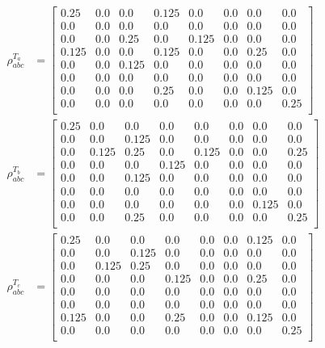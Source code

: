 \documentclass{scrartcl}
\begin{document}
    \begin{align*}
        \rho^{T_a}_{abc} &=
        \left[
        \begin{array}{cccccccc}
        0.25 & 0.0 & 0.0 & 0.125 & 0.0 & 0.0 & 0.0 & 0.0 \\
        0.0 & 0.0 & 0.0 & 0.0 & 0.0 & 0.0 & 0.0 & 0.0 \\
        0.0 & 0.0 & 0.25 & 0.0 & 0.125 & 0.0 & 0.0 & 0.0 \\
        0.125 & 0.0 & 0.0 & 0.125 & 0.0 & 0.0 & 0.25 & 0.0 \\
        0.0 & 0.0 & 0.125 & 0.0 & 0.0 & 0.0 & 0.0 & 0.0 \\
        0.0 & 0.0 & 0.0 & 0.0 & 0.0 & 0.0 & 0.0 & 0.0 \\
        0.0 & 0.0 & 0.0 & 0.25 & 0.0 & 0.0 & 0.125 & 0.0 \\
        0.0 & 0.0 & 0.0 & 0.0 & 0.0 & 0.0 & 0.0 & 0.25 \\
        \end{array}
        \right]   \\
        \rho^{T_b}_{abc} &=
        \left[
        \begin{array}{cccccccc}
        0.25 & 0.0 & 0.0 & 0.0 & 0.0 & 0.0 & 0.0 & 0.0 \\
        0.0 & 0.0 & 0.125 & 0.0 & 0.0 & 0.0 & 0.0 & 0.0 \\
        0.0 & 0.125 & 0.25 & 0.0 & 0.125 & 0.0 & 0.0 & 0.25 \\
        0.0 & 0.0 & 0.0 & 0.125 & 0.0 & 0.0 & 0.0 & 0.0 \\
        0.0 & 0.0 & 0.125 & 0.0 & 0.0 & 0.0 & 0.0 & 0.0 \\
        0.0 & 0.0 & 0.0 & 0.0 & 0.0 & 0.0 & 0.0 & 0.0 \\
        0.0 & 0.0 & 0.0 & 0.0 & 0.0 & 0.0 & 0.125 & 0.0 \\
        0.0 & 0.0 & 0.25 & 0.0 & 0.0 & 0.0 & 0.0 & 0.25 \\
        \end{array}
        \right]\\
        \rho^{T_c}_{abc} &=
        \left[
        \begin{array}{cccccccc}
        0.25 & 0.0 & 0.0 & 0.0 & 0.0 & 0.0 & 0.125 & 0.0 \\
        0.0 & 0.0 & 0.125 & 0.0 & 0.0 & 0.0 & 0.0 & 0.0 \\
        0.0 & 0.125 & 0.25 & 0.0 & 0.0 & 0.0 & 0.0 & 0.0 \\
        0.0 & 0.0 & 0.0 & 0.125 & 0.0 & 0.0 & 0.25 & 0.0 \\
        0.0 & 0.0 & 0.0 & 0.0 & 0.0 & 0.0 & 0.0 & 0.0 \\
        0.0 & 0.0 & 0.0 & 0.0 & 0.0 & 0.0 & 0.0 & 0.0 \\
        0.125 & 0.0 & 0.0 & 0.25 & 0.0 & 0.0 & 0.125 & 0.0 \\
        0.0 & 0.0 & 0.0 & 0.0 & 0.0 & 0.0 & 0.0 & 0.25 \\
        \end{array}
        \right]
        \end{align*}
\end{document}
